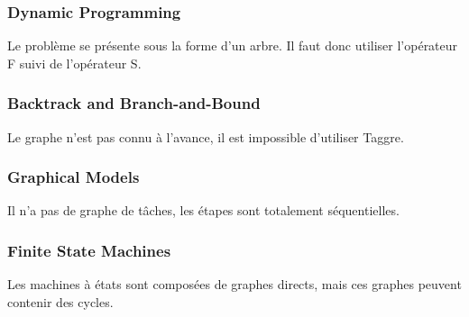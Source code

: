 \subsubsection{Dynamic Programming}
Le problème se présente sous la forme d'un arbre.
%
Il faut donc utiliser l'opérateur F suivi de l'opérateur S.


\subsubsection{Backtrack and Branch-and-Bound}
Le graphe n'est pas connu à l'avance, il est impossible d'utiliser Taggre.


\subsubsection{Graphical Models}
Il n'a pas de graphe de tâches, les étapes sont totalement séquentielles.


\subsubsection{Finite State Machines}
Les machines à états sont composées de graphes directs, mais ces graphes peuvent contenir des cycles.
